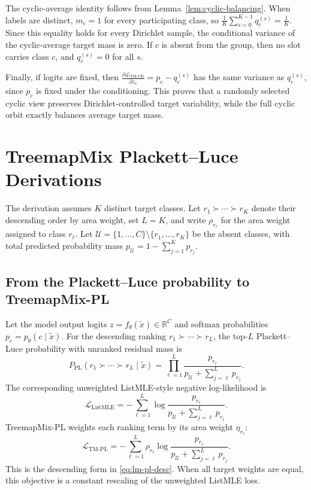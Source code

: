 The cyclic-average identity follows from Lemma~\ref{lem:cyclic-balancing}. When labels are distinct, \(m_c=1\) for every participating class, so \(\frac{1}{K}\sum_{s=0}^{K-1}q_c^{(s)}=\frac{1}{K}\).
Since this equality holds for every Dirichlet sample, the conditional variance of the cyclic-average target mass is zero. If $c$ is absent from the group, then no slot carries class $c$, and \(q_c^{(s)}=0\) for all \(s\).

Finally, if logits are fixed, then \(\frac{\partial \mathcal{L}_{\mathrm{TM\text{-}CE}}}{\partial z_c}=p_c-q_c^{(s)}\)
has the same variance as \(q_c^{(s)}\), since \(p_c\) is fixed under the conditioning. This proves that a randomly selected cyclic view preserves Dirichlet-controlled target variability, while the full cyclic orbit exactly balances average target mass.

\section{TreemapMix Plackett--Luce Derivations}\label{app:pl}

The derivation assumes $K$ distinct target classes. Let $r_1\succ\cdots\succ r_K$ denote their descending order by area weight, set $L=K$, and write $\rho_{r_\ell}$ for the area weight assigned to class $r_\ell$. Let $\mathcal{U}=\{1,\dots,C\}\setminus\{r_1,\dots,r_K\}$ be the absent classes, with total predicted probability mass $p_{\mathcal U}=1-\sum_{j=1}^{K}p_{r_j}$.

\subsection{From the Plackett--Luce probability to TreemapMix-PL}

Let the model output logits \(z=f_\theta(\tilde{x})\in\mathbb{R}^{C}\) and softmax probabilities \(p_c=p_\theta(c\mid\tilde{x})\).
For the descending ranking $r_1\succ\cdots\succ r_L$, the top-$L$ Plackett--Luce probability with unranked residual mass is
\[
P_{\mathrm{PL}}(r_1\succ\cdots\succ r_L\mid\tilde{x})
=
\prod_{\ell=1}^{L}
\frac{
p_{r_\ell}
}{
p_{\mathcal U}
+
\sum_{j=\ell}^{L}p_{r_j}
}.
\]
The corresponding unweighted ListMLE-style negative log-likelihood is
\[
\mathcal{L}_{\mathrm{ListMLE}}
=
-\sum_{\ell=1}^{L}
\log
\frac{
p_{r_\ell}
}{
p_{\mathcal U}
+
\sum_{j=\ell}^{L}p_{r_j}
}.
\]
TreemapMix-PL weights each ranking term by its area weight $\eta_{r_\ell}$:
\[
\mathcal{L}_{\mathrm{TM\text{-}PL}}
=
-\sum_{\ell=1}^{L}
\rho_{r_\ell}
\log
\frac{
p_{r_\ell}
}{
p_{\mathcal U}
+
\sum_{j=\ell}^{L}p_{r_j}
}.
\]
This is the descending form in \eqref{eq:lm-pl-desc}. When all target weights are equal, this objective is a constant rescaling of the unweighted ListMLE loss.

